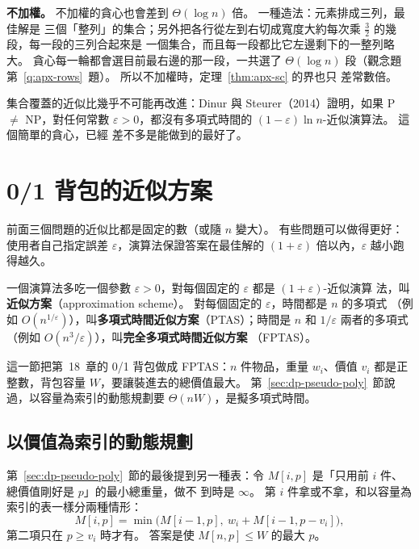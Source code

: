 \textbf{不加權。} 不加權的貪心也會差到 $\Theta(\log n)$ 倍。 一種造法：元素排成三列，最佳解是
三個「整列」的集合；另外把各行從左到右切成寬度大約每次乘 $\frac32$ 的幾段，每一段的三列合起來是
一個集合，而且每一段都比它左邊剩下的一整列略大。 貪心每一輪都會選目前最右邊的那一段，一共選了
$\Theta(\log n)$ 段（觀念題第~\ref{q:apx-rows}~題）。 所以不加權時，定理~\ref{thm:apx-sc} 的界也只
差常數倍。

集合覆蓋的近似比幾乎不可能再改進：Dinur 與 Steurer（2014）證明，如果 P $\ne$ NP，對任何常數
$\varepsilon > 0$，都沒有多項式時間的 $(1 - \varepsilon)\ln n$-近似演算法。 這個簡單的貪心，已經
差不多是能做到的最好了。

\section{0/1 背包的近似方案}
\label{sec:apx-knap}

前面三個問題的近似比都是固定的數（或隨 $n$ 變大）。 有些問題可以做得更好：使用者自己指定誤差
$\varepsilon$，演算法保證答案在最佳解的 $(1 + \varepsilon)$ 倍以內，$\varepsilon$ 越小跑得越久。

\begin{definition}[近似方案]
\label{def:apx-scheme}
一個演算法多吃一個參數 $\varepsilon > 0$，對每個固定的 $\varepsilon$ 都是 $(1 + \varepsilon)$-近似演算
法，叫\textbf{近似方案}（approximation scheme）。 對每個固定的 $\varepsilon$，時間都是 $n$ 的多項式
（例如 $O(n^{1/\varepsilon})$），叫\textbf{多項式時間近似方案}（PTAS）；時間是 $n$ 和
$1/\varepsilon$ 兩者的多項式（例如 $O(n^3/\varepsilon)$），叫\textbf{完全多項式時間近似方案}
（FPTAS）。
\end{definition}

這一節把第~18~章的 0/1 背包做成 FPTAS：$n$ 件物品，重量 $w_i$、價值 $v_i$ 都是正整數，背包容量
$W$，要讓裝進去的總價值最大。 第~\ref{sec:dp-pseudo-poly}~節說過，以容量為索引的動態規劃要
$\Theta(nW)$，是擬多項式時間。

\subsection{以價值為索引的動態規劃}

第~\ref{sec:dp-pseudo-poly}~節的最後提到另一種表：令 $M[i, p]$ 是「只用前 $i$ 件、總價值剛好是 $p$」的最小總重量，做不
到時是 $\infty$。 第 $i$ 件拿或不拿，和以容量為索引的表一樣分兩種情形：
\[
M[i, p] = \min\bigl(M[i-1, p],\ w_i + M[i-1, p - v_i]\bigr),
\]
第二項只在 $p \ge v_i$ 時才有。 答案是使 $M[n, p] \le W$ 的最大 $p$。


